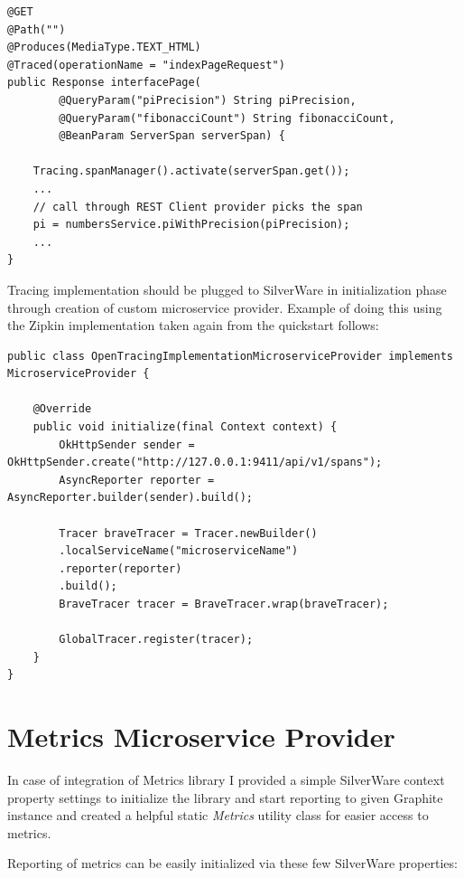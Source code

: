 \documentclass[12pt,oneside]{fithesis2}
\begin{document}
\begin{lstlisting}[caption = Integration with REST, label = restintegration, style=eclipse_java]
@GET
@Path("")
@Produces(MediaType.TEXT_HTML)
@Traced(operationName = "indexPageRequest")
public Response interfacePage(
		@QueryParam("piPrecision") String piPrecision,
		@QueryParam("fibonacciCount") String fibonacciCount,
		@BeanParam ServerSpan serverSpan) {
		
	Tracing.spanManager().activate(serverSpan.get());
	...
	// call through REST Client provider picks the span
	pi = numbersService.piWithPrecision(piPrecision);
	...
}
\end{lstlisting}

Tracing implementation should be plugged to SilverWare in initialization phase through creation of custom microservice provider. Example of doing this using the Zipkin implementation taken again from the quickstart follows:

\begin{lstlisting}[caption = Tracing implementation plugging, label = zipkinimpl, style=eclipse_java]
public class OpenTracingImplementationMicroserviceProvider implements MicroserviceProvider {

	@Override
	public void initialize(final Context context) {
		OkHttpSender sender = OkHttpSender.create("http://127.0.0.1:9411/api/v1/spans");
		AsyncReporter reporter = AsyncReporter.builder(sender).build();

		Tracer braveTracer = Tracer.newBuilder()
		.localServiceName("microserviceName")
		.reporter(reporter)
		.build();
		BraveTracer tracer = BraveTracer.wrap(braveTracer);

		GlobalTracer.register(tracer);
	}
}
\end{lstlisting}


\section{Metrics Microservice Provider}

In case of integration of Metrics library I provided a simple SilverWare context property settings to initialize the library and start reporting to given Graphite instance and created a helpful static \textit{Metrics} utility class for easier access to metrics.

Reporting of metrics can be easily initialized via these few SilverWare properties:
\end{document}
